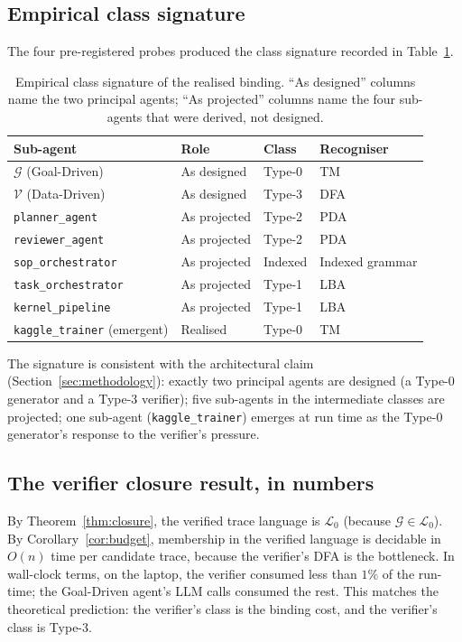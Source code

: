 \subsection{Empirical class signature}

The four pre-registered probes produced the class signature
recorded in Table~\ref{tab:class-signature}.

\begin{table}[ht]
\centering
\caption{Empirical class signature of the realised binding.
``As designed'' columns name the two principal agents; ``As
projected'' columns name the four sub-agents that were derived,
not designed.}
\label{tab:class-signature}
\begin{tabular}{l|l|l|l}
\hline
\textbf{Sub-agent} & \textbf{Role} & \textbf{Class} &
\textbf{Recogniser} \\ \hline
$\mathcal{G}$ (Goal-Driven)         & As designed & Type-0 & TM \\
$\mathcal{V}$ (Data-Driven)         & As designed & Type-3 & DFA \\ \hline
\texttt{planner\_agent}             & As projected & Type-2 & PDA \\
\texttt{reviewer\_agent}            & As projected & Type-2 & PDA \\
\texttt{sop\_orchestrator}          & As projected & Indexed & Indexed grammar \\
\texttt{task\_orchestrator}         & As projected & Type-1 & LBA \\
\texttt{kernel\_pipeline}           & As projected & Type-1 & LBA \\ \hline
\texttt{kaggle\_trainer} (emergent) & Realised     & Type-0 & TM \\ \hline
\end{tabular}
\end{table}

The signature is consistent with the architectural claim
(Section~\ref{sec:methodology}): exactly two principal agents
are designed (a Type-0 generator and a Type-3 verifier); five
sub-agents in the intermediate classes are projected; one sub-agent
(\texttt{kaggle\_trainer}) emerges at run time as the Type-0
generator's response to the verifier's pressure.

\subsection{The verifier closure result, in numbers}

By Theorem~\ref{thm:closure}, the verified trace language is
$\mathcal{L}_0$ (because $\mathcal{G}\in\mathcal{L}_0$).  By
Corollary~\ref{cor:budget}, membership in the verified language
is decidable in $O(n)$ time per candidate trace, because the
verifier's DFA is the bottleneck.  In wall-clock terms, on the
laptop, the verifier consumed less than $1\%$ of the run-time;
the Goal-Driven agent's LLM calls consumed the rest.  This
matches the theoretical prediction: the verifier's class is the
binding cost, and the verifier's class is Type-3.

